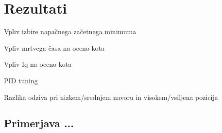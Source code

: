 \documentclass[a4paper,twoside,openright,12pt,slovene]{book}
\begin{document}
%
%
%
%
%
%



\section{Rezultati} \label{rezultati}

Vpliv izbire napačnega začetnega minimuma

Vpliv mrtvega časa na oceno kota

Vpliv Iq na oceno kota

PID tuning

Razlika odziva pri nizkem/srednjem navoru in visokem/vsiljena pozicija

\subsection{Primerjava ...} \label{graf1}
\end{document}
